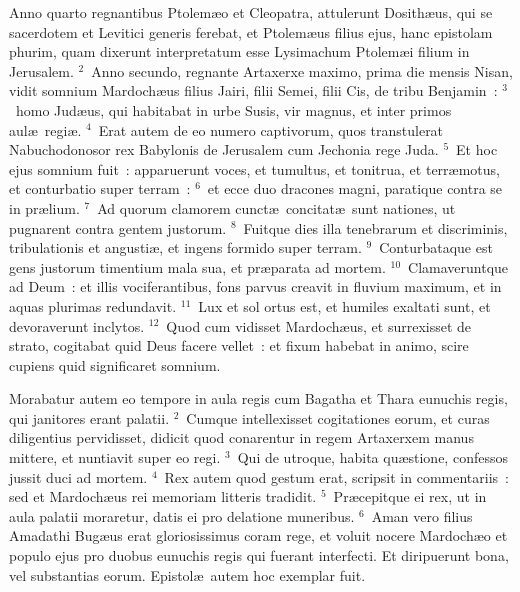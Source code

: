 \lettrine[lines=10,image=true,loversize=0.05,lraise=-0.03]{A}{}nno quarto regnantibus Ptolem\ae o et Cleopatra, attulerunt Dosith\ae us, qui se sacerdotem et Levitici generis ferebat, et Ptolem\ae us filius ejus, hanc epistolam phurim, quam dixerunt interpretatum esse Lysimachum Ptolem\ae i filium in Jerusalem.
${}^{2}$~Anno secundo, regnante Artaxerxe maximo, prima die mensis Nisan, vidit somnium Mardoch\ae us filius Jairi, filii Semei, filii Cis, de tribu Benjamin~:
${}^{3}$~homo Jud\ae us, qui habitabat in urbe Susis, vir magnus, et inter primos aul\ae\ regi\ae .
${}^{4}$~Erat autem de eo numero captivorum, quos transtulerat Nabuchodonosor rex Babylonis de Jerusalem cum Jechonia rege Juda.
${}^{5}$~Et hoc ejus somnium fuit~: apparuerunt voces, et tumultus, et tonitrua, et terr\ae motus, et conturbatio super terram~:
${}^{6}$~et ecce duo dracones magni, paratique contra se in pr\ae lium.
${}^{7}$~Ad quorum clamorem cunct\ae\ concitat\ae\ sunt nationes, ut pugnarent contra gentem justorum.
${}^{8}$~Fuitque dies illa tenebrarum et discriminis, tribulationis et angusti\ae , et ingens formido super terram.
${}^{9}$~Conturbataque est gens justorum timentium mala sua, et pr\ae parata ad mortem.
${}^{10}$~Clamaveruntque ad Deum~: et illis vociferantibus, fons parvus creavit in fluvium maximum, et in aquas plurimas redundavit.
${}^{11}$~Lux et sol ortus est, et humiles exaltati sunt, et devoraverunt inclytos.
${}^{12}$~Quod cum vidisset Mardoch\ae us, et surrexisset de strato, cogitabat quid Deus facere vellet~: et fixum habebat in animo, scire cupiens quid significaret somnium.

\lettrine[lines=10,image=true,loversize=0.05,lraise=-0.03]{M}{}orabatur autem eo tempore in aula regis cum Bagatha et Thara eunuchis regis, qui janitores erant palatii.
${}^{2}$~Cumque intellexisset cogitationes eorum, et curas diligentius pervidisset, didicit quod conarentur in regem Artaxerxem manus mittere, et nuntiavit super eo regi.
${}^{3}$~Qui de utroque, habita qu\ae stione, confessos jussit duci ad mortem.
${}^{4}$~Rex autem quod gestum erat, scripsit in commentariis~: sed et Mardoch\ae us rei memoriam litteris tradidit.
${}^{5}$~Pr\ae cepitque ei rex, ut in aula palatii moraretur, datis ei pro delatione muneribus.
${}^{6}$~Aman vero filius Amadathi Bug\ae us erat gloriosissimus coram rege, et voluit nocere Mardoch\ae o et populo ejus pro duobus eunuchis regis qui fuerant interfecti. Et diripuerunt bona, vel substantias eorum. Epistol\ae\ autem hoc exemplar fuit.

